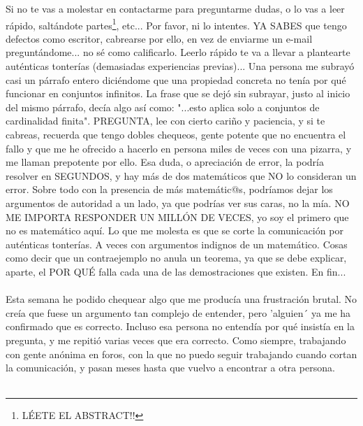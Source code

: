 	\noindent
	Si no te vas a molestar en contactarme para preguntarme dudas, o lo vas a leer rápido, saltándote partes\footnote{LÉETE EL ABSTRACT!!}, etc... Por favor, ni lo intentes. YA SABES que tengo defectos como escritor, cabrearse por ello, en vez de enviarme un e-mail preguntándome... no sé como calificarlo. Leerlo rápido te va a llevar a plantearte auténticas tonterías (demasiadas experiencias previas)... Una persona me subrayó casi un párrafo entero diciéndome que una propiedad concreta no tenía por qué funcionar en conjuntos infinitos. La frase que se dejó sin subrayar, justo al inicio del mismo párrafo, decía algo así como: "...esto aplica solo a conjuntos de cardinalidad finita". PREGUNTA, lee con cierto cariño y paciencia, y si te cabreas, recuerda que tengo dobles chequeos, gente potente que no encuentra el fallo y que me he ofrecido a hacerlo en persona miles de veces con una pizarra, y me llaman prepotente por ello. Esa duda, o apreciación de error, la podría resolver en SEGUNDOS, y hay más de dos matemáticos que NO lo consideran un error. Sobre todo con la presencia de más matemátic@s, podríamos dejar los argumentos de autoridad a un lado, ya que podrías ver sus caras, no la mía. NO ME IMPORTA RESPONDER UN MILLÓN DE VECES, yo soy el primero que no es matemático aquí. Lo que me molesta es que se corte la comunicación por auténticas tonterías. A veces con argumentos indignos de un matemático. Cosas como decir que un contraejemplo no anula un teorema, ya que se debe explicar, aparte, el POR QUÉ falla cada una de las demostraciones que existen. En fin...\\\\
	
	\noindent
	Esta semana he podido chequear algo que me producía una frustración brutal. No creía que fuese un argumento tan complejo de entender, pero 'alguien´ ya me ha confirmado que es correcto. Incluso esa persona no entendía por qué insistía en la pregunta, y me repitió varias veces que era correcto. Como siempre, trabajando con gente anónima en foros, con la que no puedo seguir trabajando cuando cortan la comunicación, y pasan meses hasta que vuelvo a encontrar a otra persona.\\\\
	
